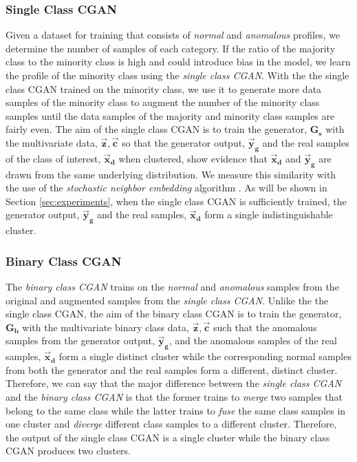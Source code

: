 \subsubsection{Single Class CGAN}
\label{subsub:scgan}
Given a dataset for training that consists of \textit{normal} and \textit{anomalous} profiles, we determine the number of samples of each category. If the ratio of the majority class to the minority class is high and could introduce bias in the model, we learn the profile of the minority class using the \textit{single class CGAN}. With the the single class CGAN trained on the minority class, we use it to generate more data samples of the minority class to augment the number of the minority class samples until the data samples of the majority and minority class samples are fairly even. The aim of the single class CGAN is to train the generator, $ \bm{G_s} $ with the multivariate data, $ \bm{\vec{z}, \vec{c}} $ so that the generator output, $ \bm{\vec{y}_g} $ and the real samples of the class of interest, $\bm{\vec{x}_d}$ when clustered, show evidence that $\bm{\vec{x}_d}$ and $ \bm{\vec{y}_g} $ are drawn from the same underlying distribution. We measure this similarity with the use of the \textit{stochastic neighbor embedding} algorithm \cite{hinton2003stochastic}. As will be shown in Section \ref{sec:experiments}, when the single class CGAN is sufficiently trained, the generator output, $ \bm{\vec{y}_g} $ and the real samples, $ \bm{\vec{x}_d} $ form a single indistinguishable cluster.
\subsubsection{Binary Class CGAN}
\label{subsub:bcgan}
The \textit{binary class CGAN} trains on the \textit{normal} and \textit{anomalous} samples from the original and augmented samples from the \textit{single class CGAN}. Unlike the the single class CGAN, the aim of the binary class CGAN is to train the generator, $ \bm{G_b} $ with the multivariate binary class data, $ \bm{\vec{z},\vec{c}} $ such that the anomalous samples from the generator output, $ \bm{\vec{y}_g} $, and the anomalous samples of the real samples, $ \bm{\vec{x}_d}$ form a single distinct cluster while the corresponding normal samples from both the generator and the real samples form a different, distinct cluster. Therefore, we can say that the major difference between the \textit{single class CGAN} and the \textit{binary class CGAN} is that the former trains to \textit{merge} two samples that belong to the same class while the latter trains to \textit{fuse} the same class samples in one cluster and \textit{diverge} different class samples to a different cluster. Therefore, the output of the single class CGAN is a single cluster while the binary class CGAN produces two clusters.
